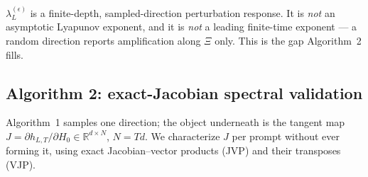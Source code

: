 \documentclass{article}
\begin{document}
\begin{center}
\end{center}

$\lambda_L^{(\epsilon)}$ is a finite-depth, sampled-direction perturbation response. It is
\emph{not} an asymptotic Lyapunov exponent, and it is \emph{not} a leading finite-time exponent
--- a random direction reports amplification along $\Xi$ only. This is the gap Algorithm~2 fills.

\subsection{Algorithm 2: exact-Jacobian spectral validation}
\label{sec:methods-alg2}

Algorithm~1 samples one direction; the object underneath is the tangent map
$J=\partial h_{L,T}/\partial H_0\in\mathbb{R}^{d\times N}$, $N=Td$. We characterize $J$
per prompt without ever forming it, using exact Jacobian--vector products (JVP) and their
transposes (VJP).
\end{document}
